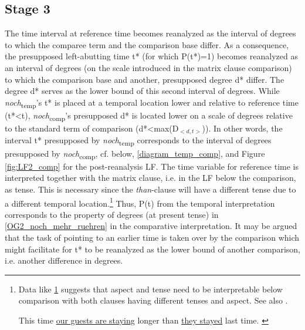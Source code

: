 \documentclass[output=paper,
modfonts
]{langscibook}
\begin{document}
\subsection{Stage 3} The time interval at reference time becomes reanalyzed as the interval of degrees to which the comparee term and the comparison base differ. As a consequence, the presupposed left-abutting time t* (for which P(t*)=1) becomes reanalyzed as an interval of degrees (on the scale introduced in the matrix clause comparison) to which the comparison base and another, presupposed degree d* differ. The degree d* serves as the lower bound of this second interval of degrees. While \textit{noch}\textsubscript{temp}'s t* is placed at a temporal location lower and relative to reference time (t*<t), \textit{noch}\textsubscript{comp}'s presupposed d* is located lower on a scale of degrees relative to the standard term of comparison (d*<max(D$_{<d,t>}$)). In other words, the interval t* presupposed by \textit{noch}\textsubscript{temp} corresponds to the interval of degrees presupposed by \textit{noch}\textsubscript{comp}, cf. below, \ref{diagram_temp_comp}, and Figure \ref{fig:LF2_comp} for the post-reanalysis LF. The time variable for reference time is interpreted together with the matrix clause, i.e. in the LF below the comparison, as tense. This is necessary since the \textit{than}-clause will have a different tense due to a different temporal location.\footnote{Data like \ref{tense_and_aspect_example} suggests that aspect and tense need to be interpretable below comparison with both clauses having different tenses and aspect. See also \citep{stechow2006}.

\ea This time \underline{our guests are staying} longer than \underline{they stayed} last time. \label{tense_and_aspect_example}\z

} Thus, P(t) from the temporal interpretation corresponds to the property of degrees (at present tense) in \ref{OG2_noch_mehr_ruehren} in the comparative interpretation. 
It may be argued that the task of pointing to an earlier time is taken over by the comparison which might facilitate for t* to be reanalyzed as the lower bound of another comparison, i.e. another difference in degrees. 
\end{document}
